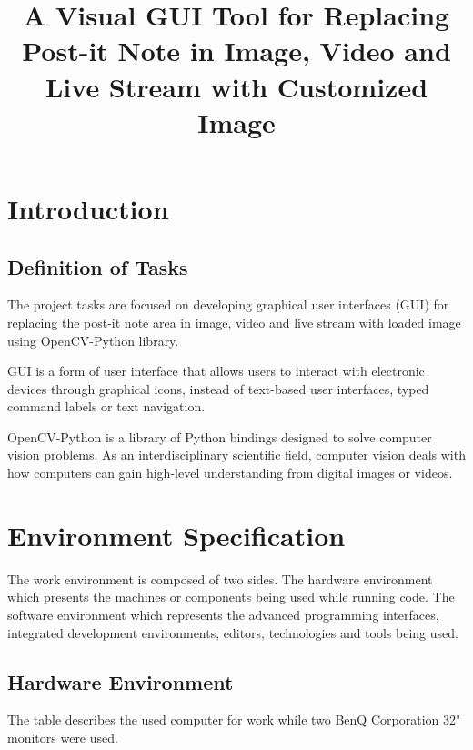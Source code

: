 \documentclass[a4paper, twoside]{report}
\title{A Visual GUI Tool for Replacing Post-it Note in Image, Video and Live Stream with Customized Image}
\begin{document}


\newpage
\tableofcontents
\newpage

\chapter{Introduction}
\section{Definition of Tasks}
\noindent The project tasks are focused on developing graphical user interfaces (GUI) for replacing the post-it note area in image, video and live stream with loaded image using OpenCV-Python library.  \\ \par

\noindent GUI is a form of user interface that allows users to interact with electronic devices through graphical icons, instead of text-based user interfaces, typed command labels or text navigation.  \\ \par

\noindent OpenCV-Python is a library of Python bindings designed to solve computer vision problems. As an interdisciplinary scientific field, computer vision deals with how computers can gain high-level understanding from digital images or videos.    \\ \par

\chapter{Environment Specification}
\noindent The work environment is composed of two sides. The hardware environment which presents the machines or components being used while running code. The software environment which represents the advanced programming interfaces, integrated development environments, editors, technologies and tools being used.  \\ \par

\section{Hardware Environment}
\noindent The table describes the used computer for work while two BenQ Corporation 32" monitors were used. \\ \par
\end{document}
